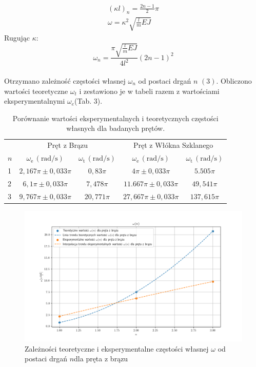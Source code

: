 \documentclass[12pt]{article}
\begin{document}
\begin{gather}
(\kappa l)_n=\frac{2n-1}{2}\pi \\
\omega=\kappa^2\sqrt{\frac{l}{m} EJ} 
\end{gather}
Rugując $\kappa$:
\begin{equation}
\omega_n=\frac{\pi \sqrt{\frac{l}{m} E J }}{4 l^{2}} (2 n - 1)^{2}
\end{equation}\\
Otrzymano zależność częstości własnej $\omega_{n}$ od postaci drgań $n$ $(3)$. Obliczono wartości teoretyczne $\omega_t$ i zestawiono je w tabeli razem z wartościami eksperymentalnymi $\omega_e$(Tab. 3).

\begin{table}[h!]
\centering
\begin{tabular}{lcccc}
\toprule
 & \multicolumn{2}{c}{Pręt z Brązu} & \multicolumn{2}{c}{Pręt z Włókna Szklanego} \\
\cmidrule(lr){2-3} \cmidrule(lr){4-5}
$n$ & \(\omega_{\text{e}} \, (\si{\radian\per\second})\) & \(\omega_{\text{t}} \, (\si{\radian\per\second})\)  & \(\omega_{\text{e}} \, (\si{\radian\per\second})\) & \(\omega_{\text{t}} \, (\si{\radian\per\second})\)  \\
\midrule
1 & \(2,167\pi  \pm 0,033 \pi\) & \(0,83\pi\) & \(4\pi  \pm 0,033 \pi\) & \(5.505\pi\)  \\
2 & \(6,1\pi  \pm 0,033 \pi\) & \(7,478\pi\) & \(11.667\pi  \pm 0,033 \pi\) & \(49,541\pi\)  \\
3 & \(9,767\pi  \pm 0,033 \pi\) & \(20,771\pi\) & \(27,667\pi  \pm 0,033 \pi\) & \(137,615\pi\) \\
\bottomrule
\end{tabular}
\caption{Porównanie wartości eksperymentalnych i teoretycznych częstości własnych dla badanych prętów.}
\label{table:omega}
\end{table}

\begin{figure}[H]
		\centering
		\includegraphics[width=20cm, center]{b1}
		\caption{Zależności teoretyczne i eksperymentalne częstości własnej $\omega$ od postaci drgań $n$dla pręta z brązu}
		\label{rys:b1}
\end{figure}
\end{document}
